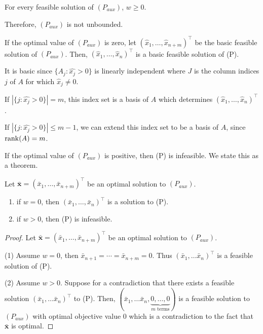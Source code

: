 For every feasible solution of $ (P_{aux}) $, $ w\geqslant  0 $.

Therefore, $ (P_{aux}) $ is not unbounded.

If the optimal value of $ (P_{aux}) $ is zero, let
$ (\hat{x}_1,\ldots,\hat{x}_{n+m})^\top$
be the basic feasible solution of $ (P_{aux}) $. Then,
$ (\hat{x}_1,\ldots,\hat{x}_{n})^\top$
is a basic feasible solution of (P).

It is basic since $ \{A_j : \hat{x_j}>0\} $ is linearly independent where
$ J $ is the column indices $ j $ of $ A $ for which $ \hat{x}_j\neq 0 $.

If $ |\{j:\hat{x_j}>0\}|=m $, this index set is a basis of $ A $ which
determines $ (\hat{x}_1,\ldots,\hat{x}_{n})^\top$.

If $ |\{j:\hat{x_j}>0\}|\leqslant m-1 $, we can extend this index set
to be a basis of $ A $, since $ \operatorname{rank}(A)=m $.

If the optimal value of $ (P_{aux}) $ is positive, then (P) is
infeasible. We state this as a theorem.

\begin{thmbox}
    \begin{theorem}
        Let $ \bar{\bm{x}}=(\bar{x}_1,\ldots ,\bar{x}_{n+m})^\top $ be an optimal solution
        to $ (P_{aux}) $.
        \begin{enumerate}[(1)]
            \item if $ w=0 $, then $ (\bar{x}_1,\ldots,\bar{x}_n)^\top $ is a solution to (P).
            \item if $ w>0 $, then (P) is infeasible.
        \end{enumerate}
    \end{theorem}
\end{thmbox}

\begin{proof}
    Let $ \bar{\bm{x}}=(\bar{x}_1,\ldots ,\bar{x}_{n+m})^\top $ be an optimal solution
    to $ (P_{aux}) $.

    (1) Assume $ w=0 $, then $ \bar{x}_{n+1}=\cdots=\bar{x}_{n+m}=0 $. Thus
    $ (\bar{x}_1,\ldots \bar{x}_n)^\top $ is a feasible solution of (P).

    (2) Assume $ w>0 $. Suppose for a contradiction that there exists a feasible
    solution $(\bar{x}_1,\ldots \bar{x}_n)^\top$ to (P). Then,
    $ (\bar{x}_1,\ldots \bar{x}_n,\underbrace{0,\ldots ,0}_{m\text{ terms}}) $ is a feasible solution to $ (P_{aux}) $
    with optimal objective value $0$ which is a contradiction to the fact that
    $ \bm{\bar{x}} $ is optimal.
\end{proof}

